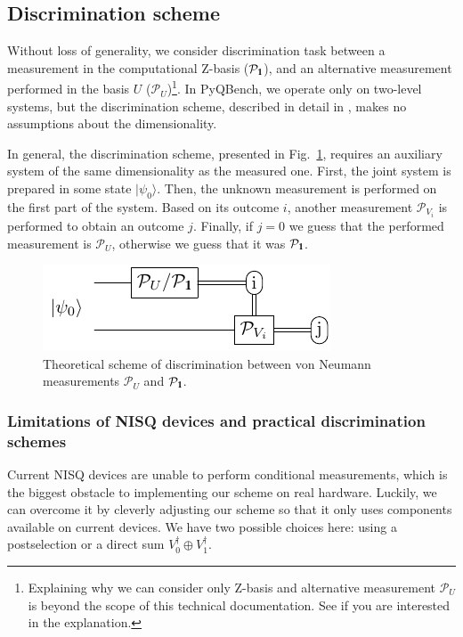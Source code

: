 \documentclass[preprint,12pt, a4paper, dvipsnames]{elsarticle}
\newcommand{\ket}[1]{\ensuremath{|#1\rangle}}
\newcommand{\1}{{\rm 1\hspace{-0.9mm}l}}
\newcommand{\Id}{{\rm 1\hspace{-0.9mm}l}}
\newcommand{\PP}{\mathcal{P}}
\begin{document}
\subsection{Discrimination scheme}\label{sec:discrimination-scheme}

Without loss of generality, we consider discrimination task between a measurement in the computational
Z-basis ($\PP_\Id$), and an alternative measurement performed in the basis $U$
($\PP_U$)\footnote{Explaining why we can consider only Z-basis and alternative measurement $\PP_{U}$ is beyond
	the scope of this technical documentation. See \cite{puchala2018strategies} if you are interested in
	the explanation.}. In PyQBench, we operate only on two-level systems, but the discrimination scheme,
described in detail in \cite{puchala2018strategies}, makes no assumptions about the dimensionality.

In general, the discrimination scheme, presented in Fig.~\ref{fig:theoretical_scheme}, requires an
auxiliary system of the same dimensionality as the measured one. First, the joint system is prepared in
some state $\ket{\psi_0}$. Then, the unknown measurement is performed on the first part of the
system. Based on its outcome $i$, another measurement $\mathcal{P}_{V_i}$ is performed to obtain an
outcome $j$. Finally, if $j=0$ we guess that the performed measurement is $\mathcal{P}_U$, otherwise
we guess that it was $\mathcal{P}_\Id$.

\begin{figure}[h!]
	\centering
	\includegraphics[scale=1.7]{pics/theoretical_scheme}
	\caption{Theoretical  scheme of discrimination  between von Neumann measurements $\PP_{U}$ and $\PP_\Id$. }
	\label{fig:theoretical_scheme}
\end{figure}

\subsubsection{Limitations of NISQ devices and practical discrimination schemes}

Current NISQ devices are unable to perform conditional measurements, which is the biggest
obstacle to implementing our scheme on real hardware. Luckily, we can overcome it by
cleverly adjusting our scheme so that it only uses components available on current devices.
We have two possible choices here: using a postselection or a direct sum
$V_0^\dagger\oplus V_1^\dagger$.
\end{document}

